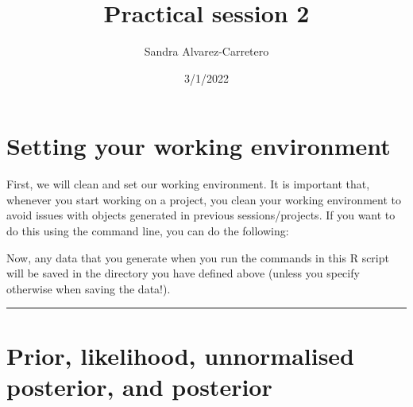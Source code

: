 \documentclass[
]{article}
\title{Practical session 2}
\author{Sandra Alvarez-Carretero}
\date{3/1/2022}
\newenvironment{Shaded}{\begin{snugshade}}{\end{snugshade}}
\newcommand{\AttributeTok}[1]{\textcolor[rgb]{0.77,0.63,0.00}{#1}}
\newcommand{\CommentTok}[1]{\textcolor[rgb]{0.56,0.35,0.01}{\textit{#1}}}
\newcommand{\FunctionTok}[1]{\textcolor[rgb]{0.00,0.00,0.00}{#1}}
\newcommand{\NormalTok}[1]{#1}
\newcommand{\OtherTok}[1]{\textcolor[rgb]{0.56,0.35,0.01}{#1}}
\newcommand{\SpecialCharTok}[1]{\textcolor[rgb]{0.00,0.00,0.00}{#1}}
\newcommand{\StringTok}[1]{\textcolor[rgb]{0.31,0.60,0.02}{#1}}
\begin{document}
\maketitle

\hypertarget{setting-your-working-environment}{%
\section{Setting your working
environment}\label{setting-your-working-environment}}

First, we will clean and set our working environment. It is important
that, whenever you start working on a project, you clean your working
environment to avoid issues with objects generated in previous
sessions/projects. If you want to do this using the command line, you
can do the following:

\begin{Shaded}
\end{Shaded}

Now, any data that you generate when you run the commands in this R
script will be saved in the directory you have defined above (unless you
specify otherwise when saving the data!).

\begin{center}\rule{0.5\linewidth}{0.5pt}\end{center}

\hypertarget{prior-likelihood-unnormalised-posterior-and-posterior}{%
\section{Prior, likelihood, unnormalised posterior, and
posterior}\label{prior-likelihood-unnormalised-posterior-and-posterior}}
\end{document}
